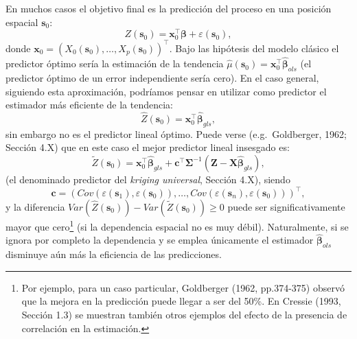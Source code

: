 \documentclass[
  spanish,
]{book}
\theoremstyle{break}
\theoremstyle{definition}
\theoremstyle{definition}
\theoremstyle{definition}
\theoremstyle{definition}
\theoremstyle{remark}
\begin{document}
En muchos casos el objetivo final es la predicción del proceso en una posición espacial \(\mathbf{s}_{0}\):
\[Z(\mathbf{s}_{0} )=\mathbf{x}_0^{\top}\boldsymbol{\beta}+\varepsilon (\mathbf{s}_{0} ),\]
donde \(\mathbf{x}_0=\left( X_{0} (\mathbf{s}_{0} ), \ldots,X_{p} (\mathbf{s}_{0})\right)^{\top}\).
Bajo las hipótesis del modelo clásico el predictor óptimo sería la estimación de la tendencia \(\hat{\mu}(\mathbf{s}_{0} ) = \mathbf{x}_0^\top \hat{\boldsymbol{\beta}}_{ols}\) (el predictor óptimo de un error independiente sería cero).
En el caso general, siguiendo esta aproximación, podríamos pensar en utilizar como predictor el estimador más eficiente de la tendencia:
\[\hat{Z} (\mathbf{s}_{0})=\mathbf{x}_0^\top \hat{\boldsymbol{\beta}}_{gls},\]
sin embargo no es el predictor lineal óptimo. Puede verse (e.g.~Goldberger, 1962; Sección 4.X) que en este caso el mejor predictor lineal insesgado es:
\begin{equation} 
  \tilde{Z}(\mathbf{s}_{0}) = \mathbf{x}_0^{\top}\hat{\boldsymbol{\beta}}_{gls} + \mathbf{c}^{\top} \boldsymbol{\Sigma}^{-1} \left( \mathbf{Z} - \mathbf{X}\hat{\boldsymbol{\beta}}_{gls} \right),
  \label{eq:predictor-kriging}
\end{equation}
(el denominado predictor del \emph{kriging universal}, Sección 4.X), siendo
\[\mathbf{c} = \left( Cov\left( \varepsilon (\mathbf{s}_{1} ),\varepsilon (\mathbf{s}_{0} )\right), \ldots, Cov\left( \varepsilon (\mathbf{s}_{n} ),\varepsilon (\mathbf{s}_{0} )\right) \right)^{\top},\]
y la diferencia \(Var( \hat{Z} (\mathbf{s}_{0} ) ) - Var( \tilde{Z} (\mathbf{s}_{0} ) ) \ge 0\) puede ser significativamente mayor que cero\footnote{Por ejemplo, para un caso particular, Goldberger (1962, pp.374-375) observó que la mejora en la predicción puede llegar a ser del 50\%. En Cressie (1993, Sección 1.3) se muestran también otros ejemplos del efecto de la presencia de correlación en la estimación.} (si la dependencia espacial no es muy débil).
Naturalmente, si se ignora por completo la dependencia y se emplea únicamente el estimador \(\hat{\boldsymbol{\beta}}_{ols}\) disminuye aún más la eficiencia de las predicciones.
\end{document}
